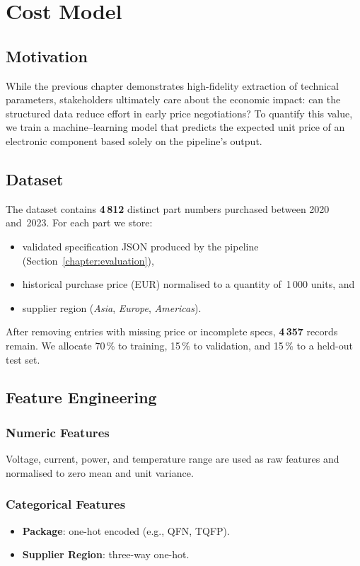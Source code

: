 \chapter{Cost Model}
\label{chapter:costmodel}

\section{Motivation}
While the previous chapter demonstrates high-fidelity extraction of technical parameters, stakeholders ultimately care about the economic impact: can the structured data reduce effort in early price negotiations?  To quantify this value, we train a machine–learning model that predicts the expected unit price of an electronic component based solely on the pipeline's output.

\section{Dataset}
The dataset contains \textbf{4\,812} distinct part numbers purchased between 2020 and~2023.  For each part we store:
\begin{itemize}
  \item validated specification JSON produced by the pipeline (Section~\ref{chapter:evaluation}),
  \item historical purchase price (EUR) normalised to a quantity of~1\,000 units, and
  \item supplier region (\textit{Asia}, \textit{Europe}, \textit{Americas}).
\end{itemize}
After removing entries with missing price or incomplete specs, \textbf{4\,357} records remain.  We allocate 70\,\% to training, 15\,\% to validation, and 15\,\% to a held-out test set.

\section{Feature Engineering}
\subsection{Numeric Features}
Voltage, current, power, and temperature range are used as raw features and normalised to zero mean and unit variance.

\subsection{Categorical Features}
\begin{itemize}
  \item \textbf{Package}: one-hot encoded (e.g., QFN, TQFP).
  \item \textbf{Supplier Region}: three-way one-hot.
\end{itemize}

